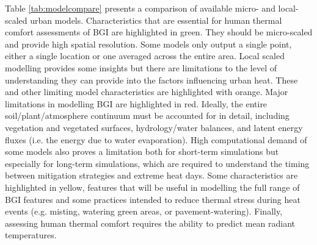 Table \ref{tab:modelcompare} presents a comparison of available micro- and local-scaled urban models. Characteristics that are essential for human thermal comfort assessments of BGI are highlighted in green. They should be micro-scaled and provide high spatial resolution. Some models only output a single point, either a single location or one averaged across the entire area.  Local scaled modelling provides some insights but there are limitations to the level of understanding they can provide into the factors influencing urban heat. These and other limiting model characteristics are highlighted with orange. Major limitations in modelling BGI are highlighted in red. Ideally, the entire soil/plant/atmosphere continuum must be accounted for in detail, including vegetation and vegetated surfaces, hydrology/water balances, and latent energy fluxes (i.e. the energy due to water evaporation). High computational demand of some models also proves a limitation both for short-term simulations but especially for long-term simulations, which are required to understand the timing between mitigation strategies and extreme heat days. Some characteristics are highlighted in yellow, features that will be useful in modelling the full range of BGI features and some practices intended to reduce thermal stress during heat events (e.g. misting, watering green areas, or pavement-watering). Finally, assessing human thermal comfort requires the ability to predict mean radiant temperatures.

